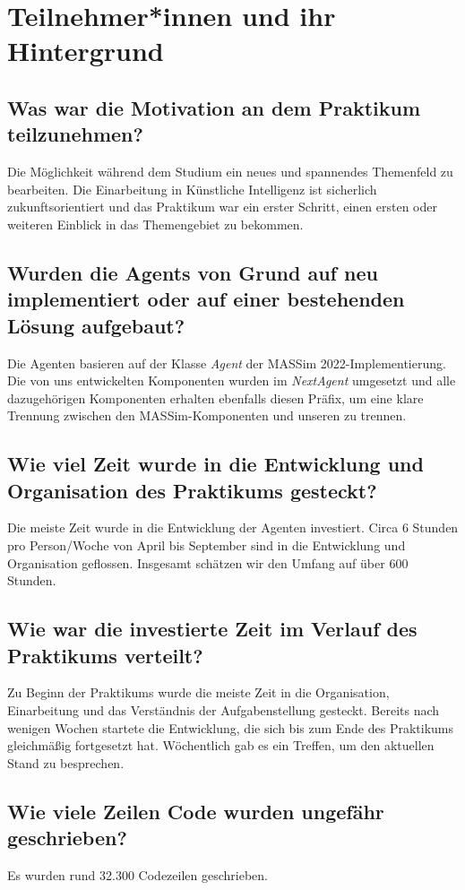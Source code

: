 \section{Teilnehmer*innen und ihr Hintergrund}
\subsection{Was war die Motivation an dem Praktikum teilzunehmen?}
Die Möglichkeit während dem Studium ein neues und spannendes Themenfeld zu bearbeiten. Die Einarbeitung in Künstliche Intelligenz ist sicherlich zukunftsorientiert und das Praktikum war ein erster Schritt, einen ersten oder weiteren Einblick in das Themengebiet zu bekommen.

\subsection{Wurden die Agents von Grund auf neu implementiert oder auf einer bestehenden Lösung aufgebaut?}
Die Agenten basieren auf der Klasse \textit{Agent} der MASSim 2022-Implementierung. Die von uns entwickelten Komponenten wurden im \textit{NextAgent} umgesetzt und alle dazugehörigen Komponenten erhalten ebenfalls diesen Präfix, um eine klare Trennung zwischen den MASSim-Komponenten und unseren zu trennen.

\subsection{Wie viel Zeit wurde in die Entwicklung und Organisation des Praktikums gesteckt?}
Die meiste Zeit wurde in die Entwicklung der Agenten investiert. Circa 6 Stunden pro Person/Woche von April bis September sind in die Entwicklung und Organisation geflossen. Insgesamt schätzen wir den Umfang auf über 600 Stunden.

\subsection{Wie war die investierte Zeit im Verlauf des Praktikums verteilt?}
Zu Beginn der Praktikums wurde die meiste Zeit in die Organisation, Einarbeitung und das Verständnis der Aufgabenstellung gesteckt. Bereits nach wenigen Wochen startete die Entwicklung, die sich bis zum Ende des Praktikums gleichmäßig fortgesetzt hat. Wöchentlich gab es ein Treffen, um den aktuellen Stand zu besprechen.

\subsection{Wie viele Zeilen Code wurden ungefähr geschrieben?}
Es wurden rund 32.300 Codezeilen geschrieben.

